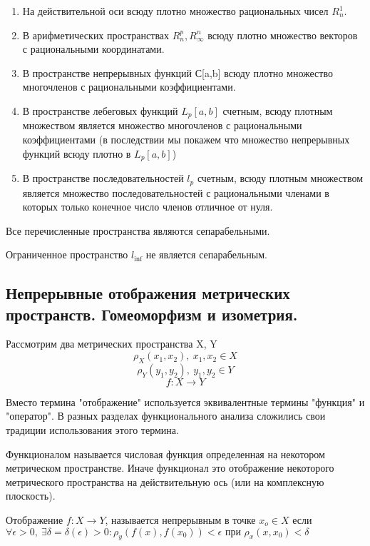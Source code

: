 \documentclass[14pt]{extarticle}
\theoremstyle{definition}
\theoremstyle{remark}
\renewcommand{\[}{\begin{dmath*}[compact]}
\renewcommand{\]}{\end{dmath*}}
\newcommand{\sep}{ , \ \allowbreak }
\begin{document}
\begin{enumerate}
  \item На действительной оси всюду плотно множество рациональных чисел $R_n^1$.

  \item В арифметических пространствах $R_n^p, R_\infty^n$ всюду плотно
  множество векторов с рациональными координатами.

  \item В пространстве непрерывных функций С[a,b] всюду плотно множество
  многочленов с рациональными коэффициентами.

  \item В пространстве лебеговых функций $L_p[a,b]$ счетным, всюду плотным
  множеством является множество многочленов с рациональными коэффициентами (в
  последствии мы покажем что множество непрерывных функций всюду плотно в
  $L_p[a,b]$)

  \item В пространстве последовательностей $l_p$ счетным, всюду плотным
  множеством является множество последовательностей с рациональными членами в
  которых только конечное число членов отличное от нуля.
\end{enumerate}

Все перечисленные пространства являются сепарабельными.

Ограниченное пространство $l_{\inf}$ не является сепарабельным.

\subsection{Непрерывные отображения метрических пространств.
Гомеоморфизм и изометрия.}

Рассмотрим два метрических пространства X, Y
\[\rho_X(x_1,x_2)\sep x_1,x_2\in X \]
\[\rho_Y(y_1, y_2)\sep y_1,y_2\in Y \]
\[ {f: X \to Y}\]

Вместо термина "отображение" используется эквивалентные термины "функция" и
"оператор". В разных разделах функционального анализа сложились свои традиции
использования этого термина.

Функционалом называется числовая функция определенная на некотором метрическом
пространстве. Иначе функционал это отображение некоторого метрического
пространства на действительную ось (или на комплексную плоскость).

Отображение $f: X \to Y$, называется непрерывным в точке $x_o \in X$ если
$ \forall \epsilon > 0 \sep \exists \delta = \delta (\epsilon) > 0:
\rho_y(f(x), f(x_0)) < \epsilon \text{ при } \rho_x(x,x_0)<\delta $
\end{document}
